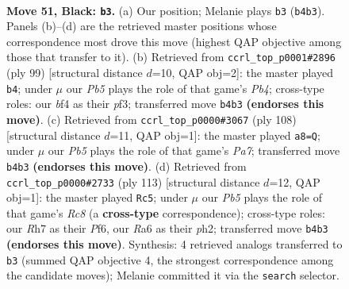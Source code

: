 \documentclass[11pt]{article}
\begin{document}
\clearpage

\begin{figure}[p]\centering
\begin{subfigure}{0.46\textwidth}\centering
\resizebox{\linewidth}{!}{%
\newchessgame
\chessboard[
  setfen={2R5/7r/rp4k1/8/1p1P1B2/3K4/8/8 b - - 6 51},
  showmover=false,
  pgfstyle=straightmove, color=movearrow, markmove={b4-b3}
]}
\caption{}
\end{subfigure}\hfill
\begin{subfigure}{0.46\textwidth}\centering
\resizebox{\linewidth}{!}{%
\newchessgame
\chessboard[
  setfen={R7/8/5k2/1p4p1/8/3KPP2/1r6/8 b - - 0 50},
  showmover=false,
  pgfstyle=straightmove, color=movearrow, markmove={b5-b4}
]}
\caption{}
\end{subfigure}
\\[4pt]
\begin{subfigure}{0.46\textwidth}\centering
\resizebox{\linewidth}{!}{%
\newchessgame
\chessboard[
  setfen={3r4/P5k1/8/5p2/1b6/5P1K/R7/8 w - - 1 55},
  showmover=false,
  pgfstyle=straightmove, color=movearrow, markmove={a7-a8}
]}
\caption{}
\end{subfigure}\hfill
\begin{subfigure}{0.46\textwidth}\centering
\resizebox{\linewidth}{!}{%
\newchessgame
\chessboard[
  setfen={8/8/5p1k/7p/R7/6P1/5K1P/2r5 b - - 19 57},
  showmover=false,
  pgfstyle=straightmove, color=movearrow, markmove={c1-c5}
]}
\caption{}
\end{subfigure}
\caption{\textbf{Move 51, Black: \texttt{b3}.} (a) Our position; Melanie plays \texttt{b3} (\texttt{b4b3}). Panels (b)--(d) are the retrieved master positions whose correspondence most drove this move (highest QAP objective among those that transfer to it). (b) Retrieved from \texttt{ccrl\_top\_p0001\#2896} (ply 99) [structural distance $d$=10, QAP obj=2]: the master played \texttt{b4}; under $\mu$ our \emph{Pb5} plays the role of that game's \emph{Pb4}; cross-type roles: our \emph{b}f4 as their \emph{p}f3; transferred move \texttt{b4b3} \textbf{(endorses this move)}. (c) Retrieved from \texttt{ccrl\_top\_p0000\#3067} (ply 108) [structural distance $d$=11, QAP obj=1]: the master played \texttt{a8=Q}; under $\mu$ our \emph{Pb5} plays the role of that game's \emph{Pa7}; transferred move \texttt{b4b3} \textbf{(endorses this move)}. (d) Retrieved from \texttt{ccrl\_top\_p0000\#2733} (ply 113) [structural distance $d$=12, QAP obj=1]: the master played \texttt{Rc5}; under $\mu$ our \emph{Pb5} plays the role of that game's \emph{Rc8} (a \textbf{cross-type} correspondence); cross-type roles: our \emph{R}h7 as their \emph{P}f6, our \emph{R}a6 as their \emph{p}h2; transferred move \texttt{b4b3} \textbf{(endorses this move)}. Synthesis: 4 retrieved analogs transferred to \texttt{b3} (summed QAP objective 4, the strongest correspondence among the candidate moves); Melanie committed it via the \texttt{search} selector.}
\label{fig:thought-m101}
\end{figure}
\end{document}
